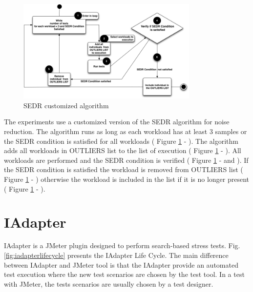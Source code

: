 \documentclass[espaco=umemeio,chapter=TITLE,twoside,openright]{abnt}
\begin{document}
\begin{figure}[!h]
\centering
\includegraphics[width=0.8\textwidth]{./images/suspectlist.png}
\caption{SEDR customized algorithm}
\label{fig:sedrcustomized}
\end{figure}


The experiments use a customized version of the SEDR algorithm for noise reduction. The algorithm runs as long as each workload has at least 3 samples or the SEDR condition is satisfied for all workloads ( Figure \ref{fig:sedrcustomized} - ). The algorithm adds all workloads in OUTLIERS list to the list of execution ( Figure \ref{fig:sedrcustomized} - ). All workloads are performed and the SEDR condition is verified  ( Figure \ref{fig:sedrcustomized} -  and  ). If the SEDR condition is satisfied the workload is removed from OUTLIERS list ( Figure \ref{fig:sedrcustomized} - ) otherwise the workload is included in the list if it is no longer present ( Figure \ref{fig:sedrcustomized} - ). 





\chapter{IAdapter }



IAdapter is a JMeter plugin designed to perform search-based stress tests. Fig. \ref{fig:iadapterlifecycle} presents the IAdapter Life Cycle. The main difference between IAdapter and JMeter tool is that the IAdapter provide an automated test execution where the new test scenarios are chosen by the test tool.  In a test with JMeter, the tests scenarios are usually chosen by a test designer.
\end{document}
